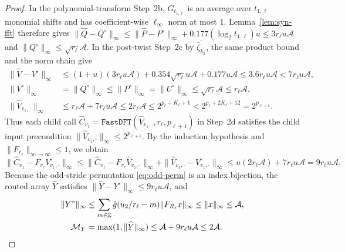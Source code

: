 \begin{proof}
In the polynomial-transform Step~2b, $G_{t_{1,\ell}}$ is an average over $t_{1,\ell}$ monomial shifts and has coefficient-wise $\ell_\infty$ norm at most $1$. Lemma~\ref{lem:syn-fft} therefore gives $\|\widehat{Q} - Q^\circ\|_\infty \le \|\widehat{P} - P^\circ\|_\infty + 0.177 (\log_2 t_{1,\ell}) u \le 3 r_\ell u \mathcal{A}$ and $\|Q^\circ\|_\infty \le \sqrt{r_\ell}\mathcal{A}$. In the post-twist Step~2c by $\overline{\bar{\zeta}_{k_2}}$, the same product bound and the norm chain give
\begin{align*}
  \|\widehat{V} - V^\circ\|_\infty &\le (1 + u)(3 r_\ell u \mathcal{A}) + 0.354 \sqrt{r_\ell} u \mathcal{A} + 0.177 u \mathcal{A} \le 3.6 r_\ell u \mathcal{A} < 7 r_\ell u \mathcal{A}, \\
  \|V^\circ\|_\infty &= \|Q^\circ\|_\infty \le \|P^\circ\|_\infty = \|U^\circ\|_\infty \le \sqrt{r_\ell}\mathcal{A} \le r_\ell \mathcal{A}, \\
  \|\widehat{V}_{v_1, \cdot}\|_\infty &\le r_\ell \mathcal{A} + 7 r_\ell u \mathcal{A} \le 2 r_\ell \mathcal{A} \le 2^{p_\ell + K_\ell + 1} < 2^{p_\ell + 2 K_\ell + 12} = 2^{p_{\ell+1}}.
\end{align*}
Thus each child call $\widehat{C}_{v_1} = \texttt{FastDFT}(\widehat{V}_{v_1, \cdot}, r_\ell, p_{\ell+1})$ in Step~2d satisfies the child input precondition $\|\widehat{V}_{v_1, \cdot}\|_\infty \le 2^{p_{\ell+1}}$. By the induction hypothesis and $\|F_{r_\ell}\|_{\infty \to \infty} \le 1$, we obtain
\[
  \|\widehat{C}_{v_1} - F_{r_\ell} V^\circ_{v_1, \cdot}\|_\infty \le \|\widehat{C}_{v_1} - F_{r_\ell} \widehat{V}_{v_1, \cdot}\|_\infty + \|\widehat{V}_{v_1, \cdot} - V^\circ_{v_1, \cdot}\|_\infty \le u(2 r_\ell \mathcal{A}) + 7 r_\ell u \mathcal{A} = 9 r_\ell u \mathcal{A}.
\]
Because the odd-stride permutation \eqref{eq:odd-perm} is an index bijection, the routed array $\widehat{Y}$ satisfies $\|\widehat{Y} - Y^\circ\|_\infty \le 9 r_\ell u \mathcal{A}$, and
\begin{align*}
  \|Y^\circ\|_\infty &\le \sum_{m \in \mathbb{Z}} \hat{g}(u_2/r_\ell - m) \|F_{R_\ell} x\|_\infty \le \|x\|_\infty \le \mathcal{A}, \\
  \mathcal{M}_Y &= \max(1, \|\widehat{Y}\|_\infty) \le \mathcal{A} + 9 r_\ell u \mathcal{A} \le 2\mathcal{A}.
\end{align*}


\end{proof}
